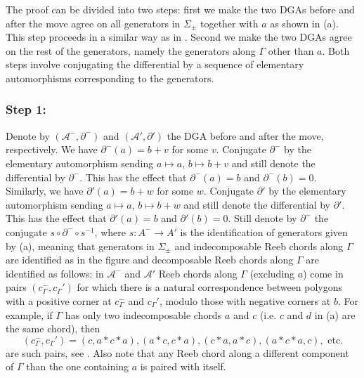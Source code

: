 \documentclass[11pt]{amsart}
\theoremstyle{mystyle}
\newcommand{\<}{\langle}
\renewcommand{\>}{\rangle}
\begin{document}
The proof can be divided into two steps: first we make the two DGAs before and after the move agree on all generators in $\Sigma_\pm$ together with $a$ as shown in (a). This step proceeds in a similar way as in \cite[Sec. 8.4]{chekanov2002dga}. Second we make the two DGAs agree on the rest of the generators, namely the generators along $\Gamma$ other than $a$. Both steps involve conjugating the differential by a sequence of elementary automorphisms corresponding to the generators.

\subsubsection*{Step 1:} 
Denote by $(\mathcal{A}^-, \partial^-)$ and $(\mathcal{A}', \partial')$ the DGA before and after the move, respectively. We have $\partial^{-}(a) = b + v$ for some $v$. Conjugate $\partial^{-}$ by the elementary automorphism sending $a \mapsto a$, $b \mapsto b + v$ and still denote the differential by $\partial^{-}$. This has the effect that $\partial^{-}(a) = b$ and $\partial^{-}(b) = 0$. Similarly, we have $\partial'(a) = b + w$ for some $w$. Conjugate $\partial'$ by the elementary automorphism sending $a \mapsto a$, $b \mapsto b + w$ and still denote the differential by $\partial'$. This has the effect that $\partial'(a) = b$ and $\partial'(b) = 0$. Still denote by $\partial^{-}$ the conjugate $s \circ \partial^{-} \circ s^{-1}$, where $s : A^{-} \to A'$ is the identification of generators given by (a), meaning that generators in $\Sigma_\pm$ and indecomposable Reeb chords along $\Gamma$ are identified as in the figure and decomposable Reeb chords along $\Gamma$ are identified as follows: in $\mathcal{A}^-$ and $\mathcal{A}'$ Reeb chords along $\Gamma$ (excluding $a$) come in pairs $(c_\Gamma^-, c_\Gamma')$ for which there is a natural correspondence between polygons with a positive corner at $c_\Gamma^-$ and $c_\Gamma'$, modulo those with negative corners at $b$. For example, if $\Gamma$ has only two indecomposable chords $a$ and $c$ (i.e. $c$ and $d$ in (a) are the same chord), then \[(c_\Gamma^-, c_\Gamma') = (c, a * c * a), (a * c, c * a), (c * a, a * c), (a * c * a, c),\text{ etc.}\] are such pairs, see . Also note that any Reeb chord along a different component of $\Gamma$ than the one containing $a$ is paired with itself.
\end{document}
